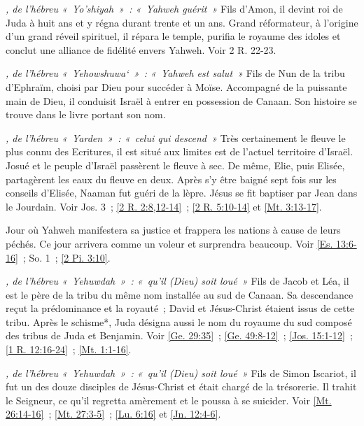 \begin{multicols}{2}
\textit{, de l'hébreu «~Yo'shiyah~»~: «~Yahweh guérit~»}\newline
Fils d'Amon, il devint roi de Juda à huit ans et y régna durant trente et un ans. Grand réformateur, à l'origine d'un grand réveil spirituel, il répara le temple, purifia le royaume des idoles et conclut une alliance de fidélité envers Yahweh. Voir 2 R. 22-23.

\textit{, de l'hébreu «~Yehowshuwa`~»~: «~Yahweh est salut~»}\newline
Fils de Nun de la tribu d'Ephraïm, choisi par Dieu pour succéder à Moïse. Accompagné de la puissante main de Dieu, il conduisit Israël à entrer en possession de Canaan. Son histoire se trouve dans le livre portant son nom.

\textit{, de l'hébreu «~Yarden~»~: «~celui qui descend~»}\newline
Très certainement le fleuve le plus connu des Ecritures, il est situé aux limites est de l'actuel territoire d'Israël. Josué et le peuple d'Israël passèrent le fleuve à sec. De même, Elie, puis Elisée, partagèrent les eaux du fleuve en deux. Après s'y être baigné sept fois sur les conseils d'Elisée, Naaman fut guéri de la lèpre. Jésus se fit baptiser par Jean dans le Jourdain. Voir Jos. 3~; \vref{2 R. 2:8,12-14}~; \vref{2 R. 5:10-14} et \vref{Mt. 3:13-17}.

\textit{}\newline
Jour où Yahweh manifestera sa justice et frappera les nations à cause de leurs péchés. Ce jour arrivera comme un voleur et surprendra beaucoup. Voir \vref{Es. 13:6-16}~; So. 1~; \vref{2 Pi. 3:10}.

\textit{, de l'hébreu «~Yehuwdah~»~: «~qu'il (Dieu) soit loué~»}\newline
Fils de Jacob et Léa, il est le père de la tribu du même nom installée au sud de Canaan. Sa descendance reçut la prédominance et la royauté~; David et Jésus-Christ étaient issus de cette tribu. Après le schisme*, Juda désigna aussi le nom du royaume du sud composé des tribus de Juda et Benjamin. Voir \vref{Ge. 29:35}~; \vref{Ge. 49:8-12}~; \vref{Jos. 15:1-12}~; \vref{1 R. 12:16-24}~; \vref{Mt. 1:1-16}.

\textit{, de l'hébreu «~Yehuwdah~»~: «~qu'il (Dieu) soit loué~»}\newline
Fils de Simon Iscariot, il fut un des douze disciples de Jésus-Christ et était chargé de la trésorerie. Il trahit le Seigneur, ce qu'il regretta amèrement et le poussa à se suicider. Voir \vref{Mt. 26:14-16}~; \vref{Mt. 27:3-5}~; \vref{Lu. 6:16} et \vref{Jn. 12:4-6}.


\end{multicols}
